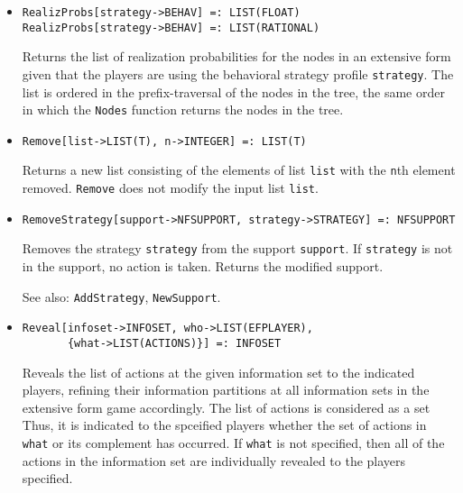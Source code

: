 \begin{itemize}
\item
\protect \large \begin{verbatim}
RealizProbs[strategy->BEHAV] =: LIST(FLOAT)
RealizProbs[strategy->BEHAV] =: LIST(RATIONAL)
\end{verbatim}\normalsize

\bd
Returns the list of realization probabilities for the
nodes in an extensive form given that the players are using the behavioral
strategy profile \verb+strategy+.  The list is ordered in the prefix-traversal
of the nodes in the tree, the same order in which the {\tt Nodes} function
returns the nodes in the tree.
\ed

\item
\protect \large \begin{verbatim}
Remove[list->LIST(T), n->INTEGER] =: LIST(T)
\end{verbatim}\normalsize

\bd
Returns a new list consisting of the elements of list
\verb+list+ with the \verb+n+th element removed.  {\tt Remove} does not
modify the input list \verb+list+.
\ed

\item
\protect \large \begin{verbatim}
RemoveStrategy[support->NFSUPPORT, strategy->STRATEGY] =: NFSUPPORT
\end{verbatim}\normalsize

\bd
Removes the strategy \verb+strategy+ from the
support \verb+support+.  If \verb+strategy+ is not in the support,
no action is taken.  Returns the modified support.
\item
[See also:] {\tt AddStrategy}, {\tt NewSupport}.
\ed

\item
\protect \large \begin{verbatim}
Reveal[infoset->INFOSET, who->LIST(EFPLAYER), 
       {what->LIST(ACTIONS)}] =: INFOSET
\end{verbatim}\normalsize

\bd
Reveals the list of actions at the given information
set to the indicated players, refining their information partitions at
all information sets in the extensive form game accordingly.  The list
of actions is considered as a set Thus, it is indicated to the
spceified players whether the set of actions in \verb+what+ or its
complement has occurred.  If \verb+what+ is not specified, then all of
the actions in the information set are individually revealed to
the players specified.  
\ed



\end{itemize}
